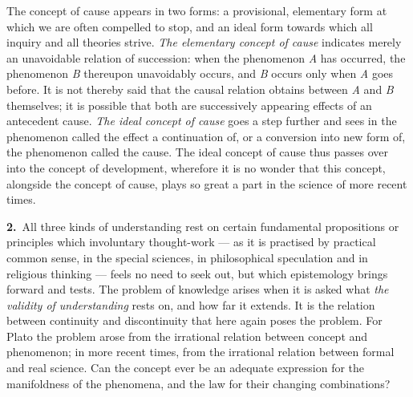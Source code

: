 \documentclass[12pt,a4paper]{book}
\newcommand{\opage}[1]{\marginnote{\footnotesize\textit{[#1]}}}
\begin{document}
The concept of cause appears in two forms: a provisional, elementary form at
which we are often compelled to stop, and an ideal form towards which all
inquiry and all theories strive. \emph{The elementary concept of cause}
indicates merely an unavoidable relation of succession: when the phenomenon
\textit{A} has occurred, the phenomenon \textit{B} thereupon unavoidably occurs,
and \textit{B} occurs only when \textit{A} goes before. It is not thereby said
that the causal relation obtains between \textit{A} and \textit{B} themselves;
it is possible that both are successively appearing effects of an antecedent
cause. \emph{The ideal \opage{31}concept of cause} goes a step further and sees in the
phenomenon called the effect a continuation of, or a conversion into new form
of, the phenomenon called the cause. The ideal concept of cause thus passes over
into the concept of development, wherefore it is no wonder that this concept,
alongside the concept of cause, plays so great a part in the science of more
recent times.

\noindent\textbf{2.}~All three kinds of understanding rest on certain
fundamental propositions or principles which involuntary thought-work --- as it
is practised by practical common sense, in the special sciences, in
philosophical speculation and in religious thinking --- feels no need to seek
out, but which epistemology brings forward and tests. The problem of knowledge
arises when it is asked what \emph{the validity of understanding} rests on, and
how far it extends. It is the relation between continuity and discontinuity that
here again poses the problem. For Plato the problem arose from the irrational
relation between concept and phenomenon; in more recent times, from the
irrational relation between formal and real science. Can the concept ever be an
adequate expression for the manifoldness of the phenomena, and the law for their
changing combinations?
\end{document}
